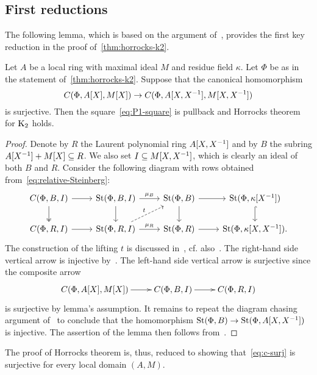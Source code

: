 \subsection{First reductions} \label{subsec:structure-theorem-overview}

The following lemma, which is based on the argument of~\cite[Theorem~2]{LS20},
 provides the first key reduction in the proof of~\cref{thm:horrocks-k2}.
\begin{lemma} \label{lem:first-reduction}
Let $A$ be a local ring with maximal ideal $M$ and residue field $\kappa$.
Let $\Phi$ be as in the statement of~\cref{thm:horrocks-k2}.
Suppose that the canonical homomorphism
\begin{equation} \label{eq:c-surj} C(\Phi, A[X], M[X]) \to C(\Phi, A[X, X^{-1}], M[X, X^{-1}]) \end{equation}
is surjective.
Then the square~\eqref{eq:P1-square} is pullback and Horrocks theorem for $\operatorname{K}_2$ holds.
\end{lemma}
\begin{proof}
    Denote by $R$ the Laurent polynomial ring $A[X, X^{-1}]$ and by $B$ the subring $A[X^{-1}] + M[X] \subseteq R$.
    We also set $I \subseteq M[X, X^{-1}]$, which is clearly an ideal of both $B$ and $R$.
    Consider the following diagram with rows obtained from~\eqref{eq:relative-Steinberg}:
    \[\begin{tikzcd}
          C(\Phi, B, I) \arrow{r} \arrow[d, swap, twoheadrightarrow] & \St(\Phi, B, I) \arrow{r}{\mu_B} \arrow{d} & \St(\Phi, B) \arrow{r} \arrow{d} & \St(\Phi, \kappa[X^{-1}]) \arrow[hookrightarrow]{d} \\
          C(\Phi, R, I) \arrow{r} & \St(\Phi, R, I) \arrow{r}{\mu_R} \arrow[ur, "t", dashrightarrow] & \St(\Phi, R) \arrow{r} & \St(\Phi, \kappa[X, X^{-1}]).
    \end{tikzcd}\]
    The construction of the lifting $t$ is discussed in~\cite[\S~2]{LS17}, cf. also~\cite[Lemma~3.3]{LS20}.
    The right-hand side vertical arrow is injective by~\cite[Lemma~2.2]{LS20}.
    The left-hand side vertical arrow is surjective since the composite arrow
    \[\xymatrix{ C(\Phi, A[X], M[X]) \ar[r] & C(\Phi, B, I) \ar[r] & C(\Phi, R, I) }\]
    is surjective by lemma's assumption.
    It remains to repeat the diagram chasing argument of~\cite[Theorem~1]{LS20} to conclude that the homomorphism $\operatorname{St}(\Phi, B) \to \operatorname{St}(\Phi, A[X, X^{-1}])$ is injective.
    The assertion of the lemma then follows from~\cite[Theorem~3]{LS20}.
\end{proof}
The proof of Horrocks theorem is, thus, reduced to showing that~\eqref{eq:c-surj} is surjective for every local domain $(A, M)$.

